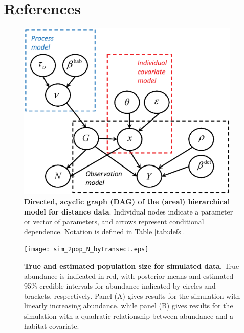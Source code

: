 \documentclass[10pt]{article}
\begin{document}
\section*{References}

\clearpage


\begin{figure}
\begin{center}
\includegraphics[width=0.95\textwidth]{DAG_simple.eps}
\end{center}
\caption{{\bf Directed, acyclic graph (DAG) of the (areal) hierarchical model
for distance data}. Individual nodes indicate a parameter or vector of parameters, and arrows represent conditional dependence. Notation is defined in Table \ref{tab:defs}.}
\label{fig:DAG}
\end{figure}
\clearpage

\begin{figure}
\begin{center}
\texttt{[image: sim\_2pop\_N\_byTransect.eps]}
\end{center}
\caption{{\bf True and estimated population size for simulated data}. True abundance is indicated in red, with posterior means and estimated 95\% credible intervals for abundance indicated by circles and brackets, respectively.  Panel (A) gives results for the simulation with linearly increasing abundance, while panel (B) gives results for the simulation with a quadratic relationship between abundance and a habitat covariate.}
\label{fig:sim_N}
\end{figure}
\clearpage
\end{document}
